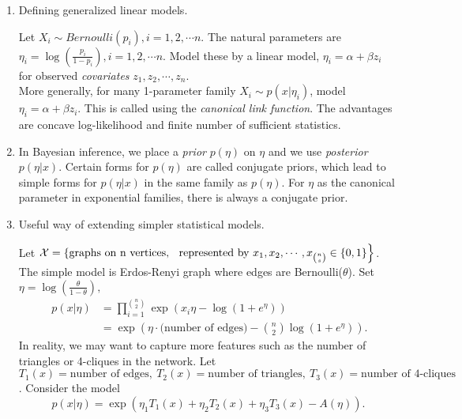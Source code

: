 \documentclass[a4paper]{article}
\begin{document}
\begin{answer}
	\quad
	\begin{enumerate}
		\item Defining generalized linear models. 
		\begin{eg}
			Let $X_i\sim{Bernoulli(p_i)},i = 1,2,\cdots n$. The natural parameters are $\eta_i = \log(\frac{p_i}{1-p_i}),i = 1,2,\cdots n$. Model these by a linear model, $\eta_i = \alpha + \beta z_i$ for observed \emph{covariates} $z_1, z_2, \cdots,z_n$. \\
			More generally, for many 1-parameter family $X_i\sim{p(x|\eta_i)}$, model $\eta_i = \alpha + \beta z_i$. This is called using the \emph{canonical link function}. The advantages are concave log-likelihood and finite number of sufficient statistics.
	  	\end{eg}
		 \item In Bayesian inference, we place a \emph{prior} $p(\eta)$ on $\eta$ and we use \emph{posterior} $p(\eta | x)$. Certain forms for $p(\eta)$ are called conjugate priors, which lead to simple forms for $p(\eta | x)$ in the same family as $p(\eta)$. For $\eta$ as the canonical parameter in exponential families, there is always a conjugate prior.
		 \item Useful way of extending simpler statistical models.
		\begin{eg}
			Let $\mathcal{X} = \left\{ \text{graphs on n vertices,} \right.\\ \left.\text{ represented by } x_1, x_2, \cdots, x_{\binom{n}{s}} \in \{0,1\}  \right\}$. The simple model is Erdos-Renyi graph where edges are Bernoulli($\theta$). Set $\eta = \log(\frac{\theta}{1-\theta}),$
			\begin{equation}
		 		\begin{aligned}
		 		\ p(x|\eta) &= \prod \limits_{i = 1}^{\binom{n}{2}} \exp(x_i \eta - \log(1+e^{\eta}))\\
		 			&= \exp\left(\eta \cdot \text{(number of edges)} - \binom{n}{2}\log(1+e^{\eta})\right).
		 		\end{aligned}
			\end{equation}
			In reality, we may want to capture more features such as the number of triangles or 4-cliques in the network. Let $T_1(x) = \text{number of edges}, \ T_2(x) = \text{number of triangles}, \ T_3(x) = \text{number of 4-cliques}$. Consider the model
			\begin{equation}
				p(x|\eta) = \exp(\eta_1 T_1(x) + \eta_2 T_2(x) + \eta_3 T_3(x) - A(\eta)).

\end{equation}
\end{eg}
\end{enumerate}
\end{answer}
\end{document}
